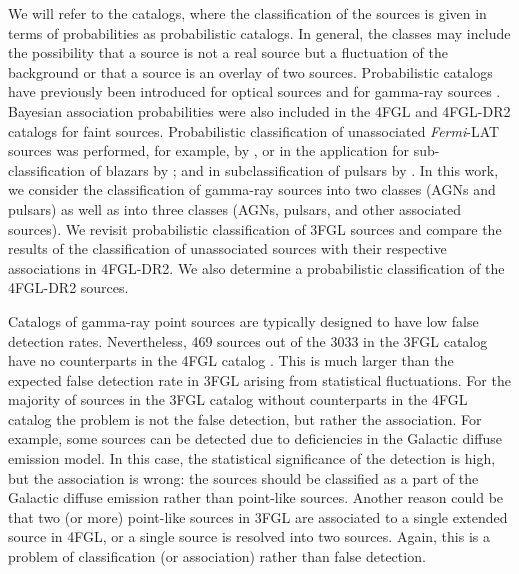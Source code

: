 \documentclass{aa}
\newcommand{\Fermi}{\textit{Fermi}\xspace}
\begin{document}
We will refer to the catalogs, where the classification of the sources is given in terms of probabilities as probabilistic catalogs.
In general, the classes may include the possibility that a source is not a real source but a fluctuation of the background 
\citep{2021A&A...656A..62P}
or that a source is an overlay of two sources.
Probabilistic catalogs
have previously been introduced for optical sources 
\citep[e.g.,][]{2010EAS....45..351H, 2013AJ....146....7B}
and for gamma-ray sources \citep{2017ApJ...839....4D}.
Bayesian association probabilities were also included in the 4FGL \citep{2020ApJS..247...33A} and
4FGL-DR2 \citep{2020arXiv200511208B} catalogs for faint sources.
Probabilistic classification of unassociated \Fermi-LAT sources was performed, for example, by
\cite{2012ApJ...753...83A, 2016ApJ...820....8S, 2016ApJ...825...69M, 2017A&A...602A..86L, 2020MNRAS.492.5377L, 
2021MNRAS.507.4061F, 2021RAA....21...15Z},
or in the application for sub-classification of blazars by
\hbox{\cite{2013MNRAS.428..220H, 2014ApJ...782...41D};}
\cite{2016MNRAS.462.3180C, 2017MNRAS.470.1291S, 2019MNRAS.490.4770K, 2020MNRAS.493.1926K}
and in subclassification of pulsars by \cite{2012MNRAS.424.2832L, 2016ApJ...820....8S}.
In this work, we consider the classification of gamma-ray sources into two classes (AGNs and pulsars) as well as into three classes 
(AGNs, pulsars, and other associated sources).
We revisit probabilistic classification of 3FGL sources and compare the results of the classification of unassociated sources
with their respective associations in 4FGL-DR2.
We also determine a probabilistic classification of the 4FGL-DR2 sources.


Catalogs of gamma-ray point sources are typically designed to have low false detection rates. 
Nevertheless, 469 sources out of the 3033 in the 3FGL catalog \citep{2015ApJS..218...23A} have no counterparts 
in the 4FGL catalog \citep{2020ApJS..247...33A}.
This is much larger than the expected false detection rate in 3FGL arising from statistical fluctuations.
For the majority of sources in the 3FGL catalog without counterparts in the 4FGL catalog the problem is not the false detection, 
but rather the association.
For example, some sources can be detected due to deficiencies in the Galactic diffuse emission model.
In this case, the statistical significance of the detection is high, but the association is wrong: the sources should be classified as
a part of the Galactic diffuse emission rather than point-like sources.
Another reason could be that two (or more) point-like sources in 3FGL are associated to a single extended source in 4FGL,
or a single source is resolved into two sources.
Again, this is a problem of classification (or association) rather than false detection.
\end{document}
